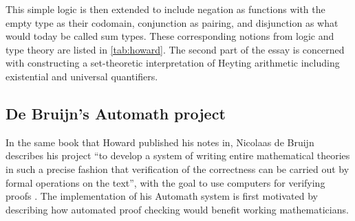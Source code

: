 \documentclass[12pt,toc=bibliography,numbers=noendperiod,
               footnotes=multiple,twoside]{scrartcl}
\begin{document}
\begin{figure}[h]
\begin{minipage}[b]{1\linewidth}
\centering
\begin{minipage}[b]{0.4\linewidth}
\begin{prooftree}
\end{prooftree}
\end{minipage}
\begin{minipage}[b]{0.4\linewidth}
\begin{prooftree}
\end{prooftree}
\end{minipage}
\end{minipage}
\end{figure}


This simple
logic is then extended to include negation as functions with the empty type as their codomain, conjunction as pairing, and disjunction as what would today be called sum types. These corresponding notions from logic and type theory are listed in \cref{tab:howard}. The second part of the essay is concerned with constructing a set-theoretic interpretation of Heyting arithmetic including existential and universal quantifiers.

\subsection{De Bruijn's Automath project}

In the same book that Howard published his notes in, Nicolaas de Bruijn describes his project \enquote{to develop a system of writing entire mathematical theories in such a precise fashion that verification of the correctness can be carried out by formal operations on the text}, with the goal to use computers for verifying proofs \autocite{de_bruijn_survey_1980}. The implementation of his Automath system is first motivated by describing how automated proof checking would benefit working mathematicians.
\end{document}
